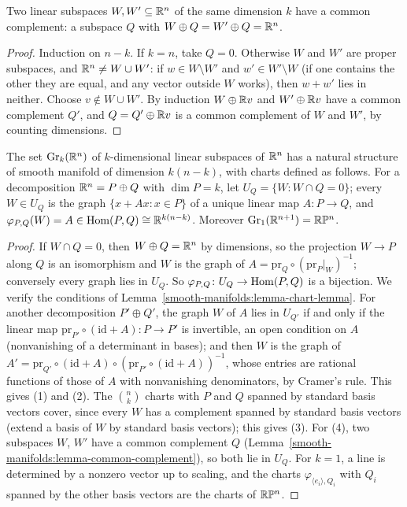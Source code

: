 \begin{lemma}\label{smooth-manifolds:lemma-common-complement}
Two linear subspaces $W, W' \subseteq \mathbb{R}^n$ of the same dimension $k$ have a common complement: a subspace $Q$ with $W \oplus Q = W' \oplus Q = \mathbb{R}^n$.
\end{lemma}

\begin{proof}
Induction on $n - k$. If $k = n$, take $Q = 0$. Otherwise $W$ and $W'$ are proper subspaces, and $\mathbb{R}^n \neq W \cup W'$: if $w \in W \setminus W'$ and $w' \in W' \setminus W$ (if one contains the other they are equal, and any vector outside
$W$ works), then $w + w'$ lies in neither. Choose $v \notin W \cup W'$. By induction $W \oplus \mathbb{R} v$ and $W' \oplus \mathbb{R} v$ have a common complement $Q'$, and $Q = Q' \oplus \mathbb{R} v$ is a common complement of $W$ and $W'$, by counting
dimensions.
\end{proof}

\begin{proposition}\label{smooth-manifolds:proposition-grassmannian}
The set $\mathrm{Gr}_k(\mathbb{R}^n)$ of $k$-dimensional linear subspaces of $\mathbb{R}^n$ has a natural structure of smooth manifold of dimension $k(n - k)$, with charts defined as follows. For a decomposition $\mathbb{R}^n = P \oplus Q$ with
$\dim P = k$, let $U_Q = \{W : W \cap Q = 0\}$; every $W \in U_Q$ is the graph $\{x + Ax : x \in P\}$ of a unique linear map $A \colon P \to Q$, and $\varphi_{P,Q}(W) = A \in \operatorname{Hom}(P, Q) \cong \mathbb{R}^{k(n-k)}$. Moreover
$\mathrm{Gr}_1(\mathbb{R}^{n+1}) = \mathbb{R}\mathbb{P}^n$.
\end{proposition}

\begin{proof}
If $W \cap Q = 0$, then $W \oplus Q = \mathbb{R}^n$ by dimensions, so the projection $W \to P$ along $Q$ is an isomorphism and $W$ is the graph of $A = \mathrm{pr}_Q \circ (\mathrm{pr}_P|_W)^{-1}$; conversely every graph lies in $U_Q$. So
$\varphi_{P,Q} \colon U_Q \to \operatorname{Hom}(P, Q)$ is a bijection. We verify the conditions of Lemma~\ref{smooth-manifolds:lemma-chart-lemma}. For another decomposition $P' \oplus Q'$, the graph $W$ of $A$ lies in $U_{Q'}$ if and only if the
linear map $\mathrm{pr}_{P'} \circ (\mathrm{id} + A) \colon P \to P'$ is invertible, an open condition on $A$ (nonvanishing of a determinant in bases); and then $W$ is the graph of
$A' = \mathrm{pr}_{Q'} \circ (\mathrm{id} + A) \circ (\mathrm{pr}_{P'} \circ (\mathrm{id} + A))^{-1}$, whose entries are rational functions of those of $A$ with nonvanishing denominators, by Cramer's rule. This gives (1) and (2). The
$\binom nk$ charts with $P$ and $Q$ spanned by standard basis vectors cover, since every $W$ has a complement spanned by standard basis vectors (extend a basis of $W$ by standard basis vectors); this gives (3). For (4), two
subspaces $W$, $W'$ have a common complement $Q$ (Lemma~\ref{smooth-manifolds:lemma-common-complement}), so both lie in $U_Q$. For $k = 1$, a line is determined by a nonzero vector up to scaling, and the charts
$\varphi_{\langle e_i\rangle, Q_i}$ with $Q_i$ spanned by the other basis vectors are the charts of $\mathbb{R}\mathbb{P}^n$.
\end{proof}

